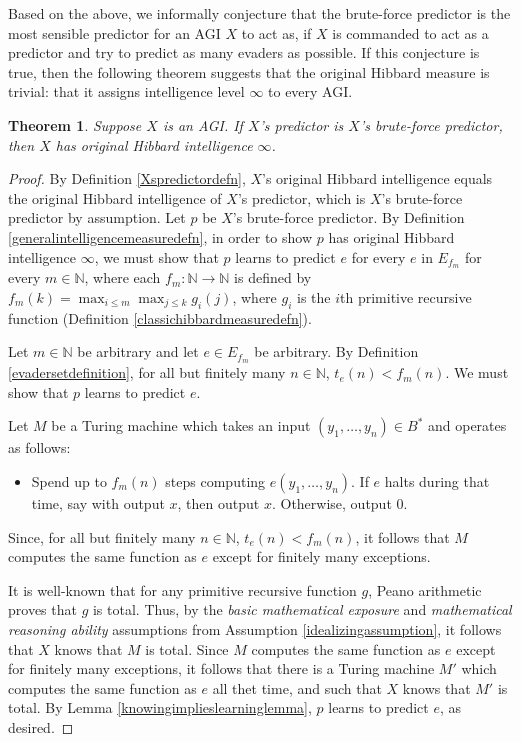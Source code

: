 \documentclass{article}
\newtheorem{theorem}{Theorem}
\begin{document}
Based on the above, we informally conjecture that the brute-force predictor is
the most sensible predictor for an AGI $X$ to act as, if $X$ is commanded to
act as a predictor and try to predict as many evaders as possible. If this conjecture
is true, then the following theorem suggests that the original Hibbard measure is
trivial: that it assigns intelligence level $\infty$ to every AGI.

\begin{theorem}
    Suppose $X$ is an AGI. If $X$'s predictor is $X$'s brute-force predictor,
    then $X$ has original Hibbard intelligence $\infty$.
\end{theorem}

\begin{proof}
    By Definition \ref{Xspredictordefn}, $X$'s original Hibbard intelligence
    equals the original Hibbard intelligence of $X$'s predictor, which is
    $X$'s brute-force predictor by assumption. Let $p$ be $X$'s brute-force
    predictor. By Definition \ref{generalintelligencemeasuredefn}, in order
    to show $p$ has original Hibbard intelligence $\infty$, we must
    show that $p$ learns to predict $e$ for every $e$ in $E_{f_m}$ for
    every $m\in\mathbb N$,
    where each $f_m:\mathbb N\to\mathbb N$ is defined by
    $f_m(k)=\max_{i\leq m}\max_{j\leq k}g_i(j)$,
    where $g_i$ is the $i$th primitive recursive function
    (Definition \ref{classichibbardmeasuredefn}).

    Let $m\in\mathbb N$ be arbitrary and let $e\in E_{f_m}$ be arbitrary.
    By Definition \ref{evadersetdefinition},
    for all but finitely many $n\in\mathbb N$, $t_e(n)<f_m(n)$.
    We must show that $p$ learns to predict $e$.

    Let $M$ be a Turing machine which takes an input
    $(y_1,\ldots,y_n)\in B^*$ and
    operates as follows:
    \begin{itemize}
        \item
        Spend up to $f_m(n)$ steps computing $e(y_1,\ldots,y_n)$.
        If $e$ halts during that time, say with output $x$, then output $x$.
        Otherwise, output $0$.
    \end{itemize}
    Since, for all but finitely many $n\in\mathbb N$, $t_e(n)<f_m(n)$,
    it follows that $M$ computes the same function as $e$ except for finitely
    many exceptions.

    It is well-known that for any primitive recursive function $g$, Peano
    arithmetic proves that $g$ is total. Thus, by the \emph{basic mathematical
    exposure} and \emph{mathematical reasoning ability} assumptions from
    Assumption \ref{idealizingassumption}, it follows that $X$ knows that
    $M$ is total. Since $M$ computes the same function as $e$ except for
    finitely many exceptions, it follows that there is a Turing machine $M'$
    which computes the same function as $e$ all thet time, and such that $X$
    knows that $M'$ is total. By Lemma \ref{knowingimplieslearninglemma},
    $p$ learns to predict $e$, as desired.
\end{proof}
\end{document}

